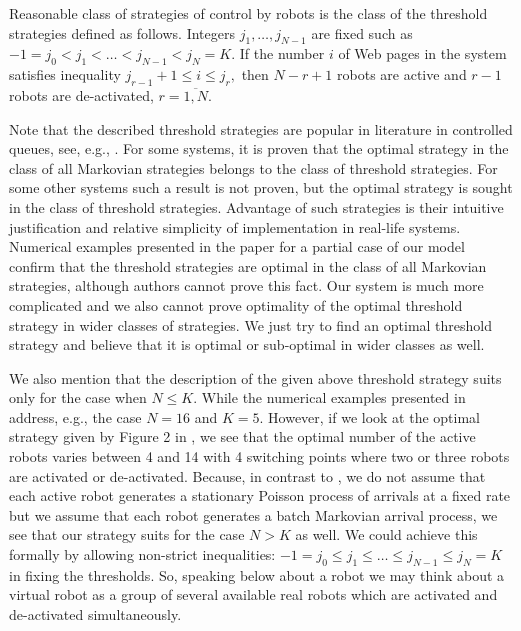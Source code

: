 \documentclass[11pt]{article}
\begin{document}
Reasonable class of strategies of control by robots is the class of
the threshold strategies defined as follows. Integers
$j_1,\dots,j_{N-1}$ are fixed such as $-1=j_0<j_1<\dots<
j_{N-1}<j_N=K.$ If the number $i$ of Web pages in the system
satisfies inequality $j_{r-1}+1 \le i \le j_r,$ then $N-r+1$ robots
are active and $r-1$ robots are de-activated, $r=\overline{1,N}.$

Note that the described threshold strategies are popular in
literature in controlled queues, see, e.g., \cite{aod,c,d,dk,t}.
For some systems, it is proven that the optimal strategy in the
class of all Markovian strategies belongs to the class of threshold
strategies. For some other systems such a result is not proven, but
the optimal strategy is sought in the class of threshold strategies.
Advantage of such strategies is their intuitive justification and
relative simplicity of implementation in real-life systems.
Numerical examples presented in the paper \cite{tlnc} for a partial
case of our model confirm that the threshold strategies are optimal
in the class of all Markovian strategies, although authors cannot
prove this fact. Our system is much more complicated and we also 
cannot prove optimality of the optimal threshold strategy in wider
classes of strategies. We just try to find an optimal threshold
strategy and believe that it is optimal or sub-optimal in wider
classes as well.

We also mention that the description of the given above threshold strategy
suits only for the case when $N \le K.$ While the numerical examples
presented in \cite{tlnc} address, e.g., the case $N=16$ and $K=5$.
However, if we look at the optimal strategy given by Figure 2 in
\cite{tlnc}, we see that the optimal number of the active robots
varies between 4 and 14 with 4 switching points where two or three
robots are activated or de-activated.  Because, in contrast to
\cite{tlnc}, we do not assume that each active robot generates a
stationary Poisson process of arrivals at a fixed rate but we assume
that each robot generates a batch Markovian arrival process,
we see that our strategy suits for the case $N
>K$ as well. We could achieve this formally by allowing non-strict inequalities:
 $-1=j_0 \le j_1\le \dots\le j_{N-1}\le j_N=K$ in fixing the
 thresholds.
 So, speaking below about a robot we may think about a virtual robot
 as a group of several
 available real robots which are activated and de-activated
 simultaneously.
\end{document}
